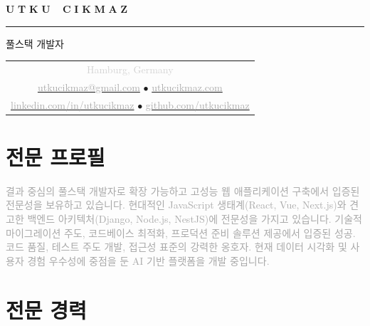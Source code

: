 \documentclass[10pt,a4paper]{article}
\newcommand{\gradientname}[1]{%
  \textcolor{darkgray!90}{\Huge\bfseries U}%
  \textcolor{darkgray!80}{\Huge\bfseries T}%
  \textcolor{darkgray!70}{\Huge\bfseries K}%
  \textcolor{darkgray!60}{\Huge\bfseries U}%
  \textcolor{mediumgray!90}{\Huge\bfseries\ }%
  \textcolor{mediumgray!80}{\Huge\bfseries C}%
  \textcolor{mediumgray!70}{\Huge\bfseries I}%
  \textcolor{mediumgray!60}{\Huge\bfseries K}%
  \textcolor{mediumgray!50}{\Huge\bfseries M}%
  \textcolor{lightgray!80}{\Huge\bfseries A}%
  \textcolor{lightgray!70}{\Huge\bfseries Z}%
}
\begin{document}
\color{black}
\pagestyle{empty}

\begin{center}
  \vspace{-3pt}
  \gradientname{UTKU CIKMAZ}
  
  \vspace{4pt}
  \textcolor{verylightgray}{\rule{0.35\textwidth}{0.6pt}}
  
  \vspace{4pt}
  {\large\color{mediumgray}풀스택 개발자}
  
  \vspace{5pt}
  \begin{tabular}{c}
    \textcolor{lightgray}{\small Hamburg, Germany} \\[2pt]
    \href{mailto:utkucikmaz@gmail.com}{\textcolor{darkgray}{utkucikmaz@gmail.com}} \quad
    \textcolor{verylightgray}{$\bullet$} \quad
    \href{https://www.utkucikmaz.com}{\textcolor{darkgray}{utkucikmaz.com}} \\[1pt]
    \href{https://linkedin.com/in/utkucikmaz}{\textcolor{darkgray}{linkedin.com/in/utkucikmaz}} \quad
    \textcolor{verylightgray}{$\bullet$} \quad
    \href{https://github.com/utkucikmaz}{\textcolor{darkgray}{github.com/utkucikmaz}}
  \end{tabular}
\end{center}

\vspace{1pt}

\section*{전문 프로필}
\vspace{0pt}
\textcolor{darkgray}{%
결과 중심의 풀스택 개발자로 확장 가능하고 고성능 웹 애플리케이션 구축에서 입증된 전문성을 보유하고 있습니다. 현대적인 JavaScript 생태계(React, Vue, Next.js)와 견고한 백엔드 아키텍처(Django, Node.js, NestJS)에 전문성을 가지고 있습니다. 기술적 마이그레이션 주도, 코드베이스 최적화, 프로덕션 준비 솔루션 제공에서 입증된 성공. 코드 품질, 테스트 주도 개발, 접근성 표준의 강력한 옹호자. 현재 데이터 시각화 및 사용자 경험 우수성에 중점을 둔 AI 기반 플랫폼을 개발 중입니다.
}
\vspace{1pt}

\section*{전문 경력}
\end{document}
